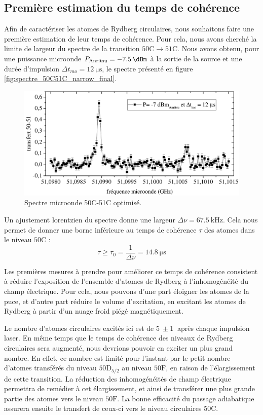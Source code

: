 \subsection{Première estimation du temps de cohérence}
\noindent Afin de caractériser les atomes de Rydberg circulaires, nous souhaitons faire une première estimation de leur temps de cohérence.
Pour cela, nous avons cherché la limite de largeur du spectre de la transition $\mathrm{50C\rightarrow 51C}$.
Nous avons obtenu, pour une puissance microonde $P_{\text{Anritsu}} = \SI{-7.5}{\dBm}$ à la sortie de la source et une durée d'impulsion $\Delta t _{mo} = \SI{12}{\us}$, le spectre présenté en figure \eqref{fig:spectre_50C51C_narrow_final}.
%
\begin{figure}[h]
\centering
\includegraphics[width=.85\linewidth]{figures/circulars/spectre_50C51C_narrow_final}
\caption[Spectre microonde 50C-51C optimisé]{
Spectre microonde 50C-51C optimisé.
}
\label{fig:spectre_50C51C_narrow_final}
\end{figure}
%		
Un ajustement lorentzien du spectre donne une largeur $\Delta\nu = \SI{67.5}{\kHz}$.
Cela nous permet de donner une borne inférieure au temps de cohérence $\tau$ des atomes dans le niveau $\mathrm{50C}$ :
\begin{equation}
\tau \geq \tau_0 = \frac{1}{\Delta\nu} = \SI{14.8}{\us}
\end{equation}

Les premières mesures à prendre pour améliorer ce temps de cohérence consistent à réduire l'exposition de l'ensemble d'atomes de Rydberg à l'inhomogénéité du champ électrique.
Pour cela, nous pouvons d'une part éloigner les atomes de la puce, et d'autre part réduire le volume d'excitation, en excitant les atomes de Rydberg à partir d'un nuage froid piégé magnétiquement.

Le nombre d'atomes circulaires excités ici est de $\SI{5}{}\pm\SI{1}{}$ après chaque impulsion laser.
En même temps que le temps de cohérence des niveaux de Rydberg circulaires sera augmenté, nous devrions pouvoir en exciter un plus grand nombre.
En effet, ce nombre est limité pour l'instant par le petit nombre d'atomes transférés du niveau $\mathrm{50D}_{5/2}$ au niveau $\mathrm{50F}$, en raison de l'élargissement de cette transition.
La réduction des inhomogénéités de champ électrique permettra de remédier à cet élargissement, et ainsi de transférer une plus grande partie des atomes vers le niveau $\mathrm{50F}$.
La bonne efficacité du passage adiabatique assurera ensuite le transfert de ceux-ci vers le niveau circulaires $\mathrm{50C}$.

